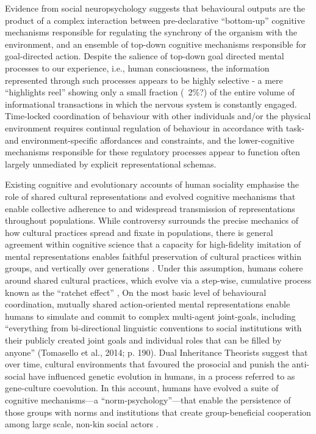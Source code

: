 \documentclass[12pt]{report}
\begin{document}
Evidence from social neuropsychology suggests that behavioural outputs are the product of a complex interaction between pre-declarative ``bottom-up'' cognitive mechanisms responsible for regulating the synchrony of the organism with the environment, and an ensemble of top-down cognitive mechanisms responsible for goal-directed action.  Despite the salience of top-down goal directed mental processes to our experience, i.e., human consciousness, the information represented through such processes appears to be highly selective - a mere ``highlights reel'' showing only a small fraction (~2\%?) of the entire volume of informational transactions in which the nervous system is constantly engaged.  Time-locked coordination of behaviour with other individuals and/or the physical environment requires continual regulation of behaviour in accordance with task- and environment-specific affordances and constraints, and the lower-cognitive mechanisms responsible for these regulatory processes appear to function often largely unmediated by explicit representational schemas.


Existing cognitive and evolutionary accounts of human sociality emphasise the role of shared cultural representations and evolved cognitive mechanisms that enable collective adherence to and widespread transmission of representations throughout populations.  While controversy surrounds the precise mechanics of how cultural practices spread and fixate in populations, there is general agreement within cognitive science that a capacity for high-fidelity imitation of mental representations enables faithful preservation of cultural practices within groups, and vertically over generations \citep{Henrich2007}. Under this assumption, humans cohere around shared cultural practices, which evolve via a step-wise, cumulative process known as the ``ratchet effect'' \citep{Tomasello1993},
On the most basic level of behavioural coordination, mutually shared action-oriented mental representations enable humans to simulate and commit to complex multi-agent joint-goals, including “everything from bi-directional linguistic conventions to social institutions with their publicly created joint goals and individual roles that can be filled by anyone”  (Tomasello et al., 2014; p. 190).  Dual Inheritance Theorists suggest that over time, cultural environments that favoured the prosocial and punish the anti-social have influenced genetic evolution in humans, in a process referred to as gene-culture coevolution. In this account, humans have evolved a suite of cognitive mechanisms—a ``norm-psychology''—that enable the persistence of those groups with norms and institutions that create group-beneficial cooperation among large scale, non-kin social actors \citep{Chudek2011}.
\end{document}
